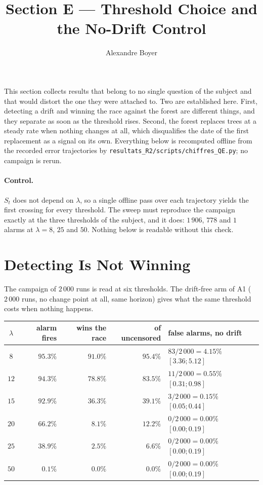 \documentclass[11pt,a4paper]{article}
\title{Section E --- Threshold Choice and the No-Drift Control}
\author{Alexandre Boyer}
\date{}
\begin{document}
\maketitle

\noindent This section collects results that belong to no single question of the subject
and that would distort the one they were attached to. Two are established here. First,
detecting a drift and winning the race against the forest are different things, and they
separate as soon as the threshold rises. Second, the forest replaces trees at a steady rate
when nothing changes at all, which disqualifies the date of the first replacement as a
signal on its own. Everything below is recomputed offline from the recorded error
trajectories by \texttt{resultats\_R2/scripts/chiffres\_QE.py}; no campaign is rerun.

\paragraph{Control.} $S_t$ does not depend on $\lambda$, so a single offline pass over each
trajectory yields the first crossing for every threshold. The sweep must reproduce the
campaign exactly at the three thresholds of the subject, and it does: $1\,906$, $778$ and
$1$ alarms at $\lambda = 8$, $25$ and $50$. Nothing below is readable without this check.

\section{Detecting Is Not Winning}

The campaign of $2\,000$ runs is read at six thresholds. The drift-free arm of A1
($2\,000$ runs, no change point at all, same horizon) gives what the same threshold costs when
nothing happens.

\begin{center}
\begin{tabular}{crrrl}
\toprule
$\lambda$ & alarm fires & wins the race & of uncensored & false alarms, no drift \\
\midrule
$8$  & $95.3\%$ & $\mathbf{91.0\%}$ & $95.4\%$ & $83/2\,000 = 4.15\%$ $[3.36;5.12]$ \\
$12$ & $94.3\%$ & $78.8\%$ & $83.5\%$ & $11/2\,000 = 0.55\%$ $[0.31;0.98]$ \\
$15$ & $92.9\%$ & $\mathbf{36.3\%}$ & $39.1\%$ & $3/2\,000 = 0.15\%$ $[0.05;0.44]$ \\
$20$ & $66.2\%$ & $8.1\%$ & $12.2\%$ & $0/2\,000 = 0.00\%$ $[0.00;0.19]$ \\
$25$ & $38.9\%$ & $2.5\%$ & $6.6\%$ & $0/2\,000 = 0.00\%$ $[0.00;0.19]$ \\
$50$ & $0.1\%$ & $0.0\%$ & $0.0\%$ & $0/2\,000 = 0.00\%$ $[0.00;0.19]$ \\
\bottomrule
\end{tabular}
\end{center}
\end{document}
